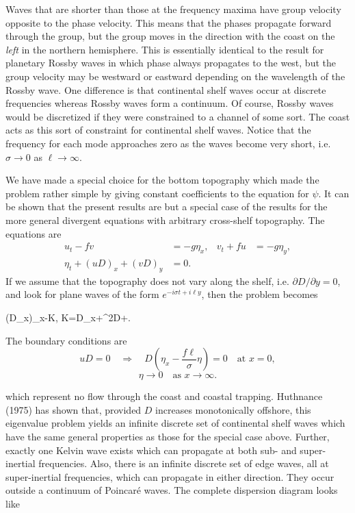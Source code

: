 \sourcepagebreak

Waves that are shorter than those at the frequency maxima have group velocity opposite
to the phase velocity. This means that the phases propagate forward through the group,
but the group moves in the direction with the coast on the \emph{left} in the northern
hemisphere. This is essentially identical to the result for planetary Rossby waves in
which phase always propagates to the west, but the group velocity may be westward or
eastward depending on the wavelength of the Rossby wave. One difference is that
continental shelf waves occur at discrete frequencies whereas Rossby waves form a
continuum. Of course, Rossby waves would be discretized if they were constrained
to a channel of some sort. The coast acts as this sort of constraint for continental
shelf waves. Notice that the frequency for each mode approaches zero as the waves
become very short, i.e. $\sigma\to0$ as $\ell\to\infty$.

We have made a special choice for the bottom topography which made the problem rather
simple by giving constant coefficients to the equation for $\psi$. It can be shown that
the present results are but a special case of the results for the more general divergent
equations with arbitrary cross-shelf topography. The equations are
\begin{align*}
	u_t-fv               & =-g\eta_x,
	                     & v_t+fu     & =-g\eta_y, \\
	\eta_t+(uD)_x+(vD)_y & =0.
\end{align*}
If we assume that the topography does not vary along the shelf, i.e.
$\partial D/\partial y=0$, and look for plane waves of the form
$e^{-i\sigma t+i\ell y}$, then the problem becomes
\begin{waveequation}
	(D\eta_x)_x-K,
	\qquad
	K=D_x+\ell^2D+.
\end{waveequation}
The boundary conditions are
\[
	uD=0\quad\Rightarrow\quad
	D\left(\eta_x-\frac{f\ell}{\sigma}\eta\right)=0
	\quad\text{at }x=0,
\]
\[
	\eta\to0\quad\text{as }x\to\infty.
\]

\sourcepagebreak

which represent no flow through the coast and coastal trapping. Huthnance (1975) has
shown that, provided $D$ increases monotonically offshore, this eigenvalue problem
yields an infinite discrete set of continental shelf waves which have the same general
properties as those for the special case above. Further, exactly one Kelvin wave exists
which can propagate at both sub- and super-inertial frequencies. Also, there is an
infinite discrete set of edge waves, all at super-inertial frequencies, which can
propagate in either direction. They occur outside a continuum of Poincaré waves. The
complete dispersion diagram looks like

